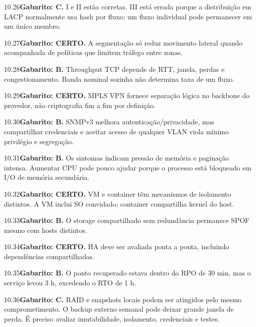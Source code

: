 \begin{solucao}{10.26}\textbf{Gabarito: C.} I e II estão corretas. III está errada porque a distribuição em LACP normalmente usa hash por fluxo; um fluxo individual pode permanecer em um único membro.\end{solucao}
\begin{solucao}{10.27}\textbf{Gabarito: CERTO.} A segmentação só reduz movimento lateral quando acompanhada de políticas que limitem tráfego entre zonas.\end{solucao}
\begin{solucao}{10.28}\textbf{Gabarito: B.} Throughput TCP depende de RTT, janela, perdas e congestionamento. Banda nominal sozinha não determina taxa de um fluxo.\end{solucao}
\begin{solucao}{10.29}\textbf{Gabarito: CERTO.} MPLS VPN fornece separação lógica no backbone do provedor, não criptografia fim a fim por definição.\end{solucao}
\begin{solucao}{10.30}\textbf{Gabarito: B.} SNMPv3 melhora autenticação/privacidade, mas compartilhar credenciais e aceitar acesso de qualquer VLAN viola mínimo privilégio e segregação.\end{solucao}
\begin{solucao}{10.31}\textbf{Gabarito: B.} Os sintomas indicam pressão de memória e paginação intensa. Aumentar CPU pode pouco ajudar porque o processo está bloqueado em I/O de memória secundária.\end{solucao}
\begin{solucao}{10.32}\textbf{Gabarito: CERTO.} VM e container têm mecanismos de isolamento distintos. A VM inclui SO convidado; container compartilha kernel do host.\end{solucao}
\begin{solucao}{10.33}\textbf{Gabarito: B.} O storage compartilhado sem redundância permanece SPOF mesmo com hosts distintos.\end{solucao}
\begin{solucao}{10.34}\textbf{Gabarito: CERTO.} HA deve ser avaliada ponta a ponta, incluindo dependências compartilhadas.\end{solucao}
\begin{solucao}{10.35}\textbf{Gabarito: B.} O ponto recuperado estava dentro do RPO de 30 min, mas o serviço levou 3 h, excedendo o RTO de 1 h.\end{solucao}
\begin{solucao}{10.36}\textbf{Gabarito: C.} RAID e snapshots locais podem ser atingidos pelo mesmo comprometimento. O backup externo semanal pode deixar grande janela de perda. É preciso avaliar imutabilidade, isolamento, credenciais e testes.\end{solucao}
